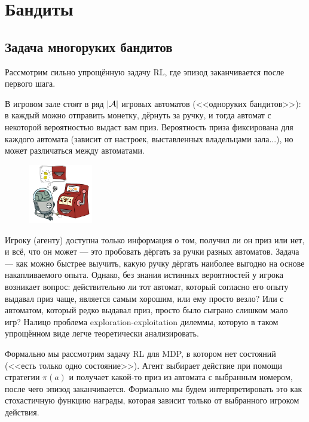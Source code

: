 
\section{Бандиты}\label{sec:bandistssection}

\subsection{Задача многоруких бандитов}

Рассмотрим сильно упрощённую задачу RL, где эпизод заканчивается после первого шага.

\begin{example}
В игровом зале стоят в ряд $|\mathcal{A}|$ игровых автоматов (<<одноруких бандитов>>): в каждый можно отправить монетку, дёрнуть за ручку, и тогда автомат с некоторой вероятностью выдаст вам приз. Вероятность приза фиксирована для каждого автомата (зависит от настроек, выставленных владельцами зала...), но может различаться между автоматами. 

\begin{figure}
\vspace{-0.6cm}
\centering
\includegraphics[width=0.25\textwidth]{Images/bandits.png}
\vspace{-0.3cm}
\end{figure}

Игроку (агенту) доступна только информация о том, получил ли он приз или нет, и всё, что он может --- это пробовать дёргать за ручки разных автоматов. Задача --- как можно быстрее выучить, какую ручку дёргать наиболее выгодно на основе накапливаемого опыта. Однако, без знания истинных вероятностей у игрока возникает вопрос: действительно ли тот автомат, который согласно его опыту выдавал приз чаще, является самым хорошим, или ему просто везло? Или с автоматом, который редко выдавал приз, просто было сыграно слишком мало игр? Налицо проблема exploration-exploitation дилеммы, которую в таком упрощённом виде легче теоретически анализировать.
\end{example}

Формально мы рассмотрим задачу RL для MDP, в котором нет состояний (<<есть только одно состояние>>). Агент выбирает действие при помощи стратегии $\pi(a)$ и получает какой-то приз из автомата с выбранным номером, после чего эпизод заканчивается. Формально мы будем интерпретировать это как стохастичную функцию награды, которая зависит только от выбранного игроком действия.

